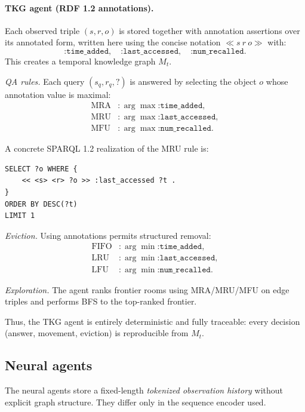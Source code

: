 \documentclass[Afour,sageh,times]{sagej}
\begin{document}
\paragraph{TKG agent (RDF 1.2 annotations).}
Each observed triple $(s,r,o)$ is stored together with annotation assertions over its
annotated form, written here using the concise notation $\ll s\ r\ o\gg$ with:
\[
\texttt{:time\_added},\quad \texttt{:last\_accessed},\quad
\texttt{:num\_recalled}.
\]
This creates a temporal knowledge graph $M_t$.

\emph{QA rules.}  
Each query $(s_q,r_q,?)$ is answered by selecting the object $o$ whose
annotation value is maximal:
\[
\begin{aligned}
\text{MRA} &: \arg\max \texttt{:time\_added},\\
\text{MRU} &: \arg\max \texttt{:last\_accessed},\\
\text{MFU} &: \arg\max \texttt{:num\_recalled}.
\end{aligned}
\]

A concrete SPARQL 1.2 realization of the MRU rule is:
\begin{lstlisting}[language=SPARQL,basicstyle=\ttfamily\small,frame=single]
SELECT ?o WHERE {
    << <s> <r> ?o >> :last_accessed ?t .
}
ORDER BY DESC(?t)
LIMIT 1
\end{lstlisting}

\emph{Eviction.}  
Using annotations permits structured removal:
\[
\begin{aligned}
\text{FIFO} &: \arg\min \texttt{:time\_added},\\
\text{LRU} &: \arg\min \texttt{:last\_accessed},\\
\text{LFU} &: \arg\min \texttt{:num\_recalled}.
\end{aligned}
\]

\emph{Exploration.}  
The agent ranks frontier rooms using MRA/MRU/MFU on edge triples and
performs BFS to the top-ranked frontier.

Thus, the TKG agent is entirely deterministic and fully traceable: every decision
(answer, movement, eviction) is reproducible from $M_t$.

\subsection{Neural agents}

The neural agents store a fixed-length \emph{tokenized observation history} without
explicit graph structure. They differ only in the sequence encoder used.
\end{document}
